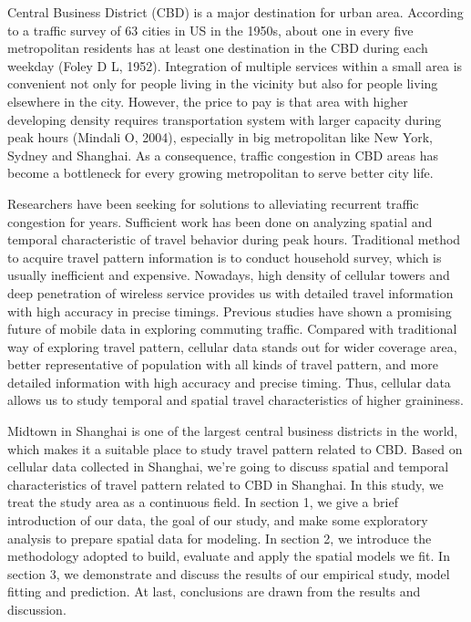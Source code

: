 \documentclass[hidelinks,12pt]{article}
\begin{document}
	Central Business District (CBD) is a major destination for urban area. According to a traffic survey of 63 cities in US in the 1950s, about one in every five metropolitan residents has at least one destination in the CBD during each weekday (Foley D L, 1952). Integration of multiple services within a small area is convenient not only for people living in the vicinity but also for people living elsewhere in the city. However, the price to pay is that area with higher developing density requires transportation system with larger capacity during peak hours (Mindali O, 2004), especially in big metropolitan like New York, Sydney and Shanghai. As a consequence, traffic congestion in CBD areas has become a bottleneck for every growing metropolitan to serve better city life.
	
	Researchers have been seeking for solutions to alleviating recurrent traffic congestion for years. Sufficient work has been done on analyzing spatial and temporal characteristic of travel behavior during peak hours. Traditional method to acquire travel pattern information is to conduct household survey, which is usually inefficient and expensive. Nowadays, high density of cellular towers and deep penetration of wireless service provides us with detailed travel information with high accuracy in precise timings. Previous studies have shown a promising future of mobile data in exploring commuting traffic. Compared with traditional way of exploring travel pattern, cellular data stands out for wider coverage area, better representative of population with all kinds of travel pattern, and more detailed information with high accuracy and precise timing. Thus, cellular data allows us to study temporal and spatial travel characteristics of higher graininess. 
	
	Midtown in Shanghai is one of the largest central business districts in the world, which makes it a suitable place to study travel pattern related to CBD. Based on cellular data collected in Shanghai, we’re going to discuss spatial and temporal characteristics of travel pattern related to CBD in Shanghai. In this study, we treat the study area as a continuous field. In section 1, we give a brief introduction of our data, the goal of our study, and make some exploratory analysis to prepare spatial data for modeling. In section 2, we introduce the methodology adopted to build, evaluate and apply the spatial models we fit. In section 3, we demonstrate and discuss the results of our empirical study, model fitting and prediction. At last, conclusions are drawn from the results and discussion. 	
	
\end{document}
